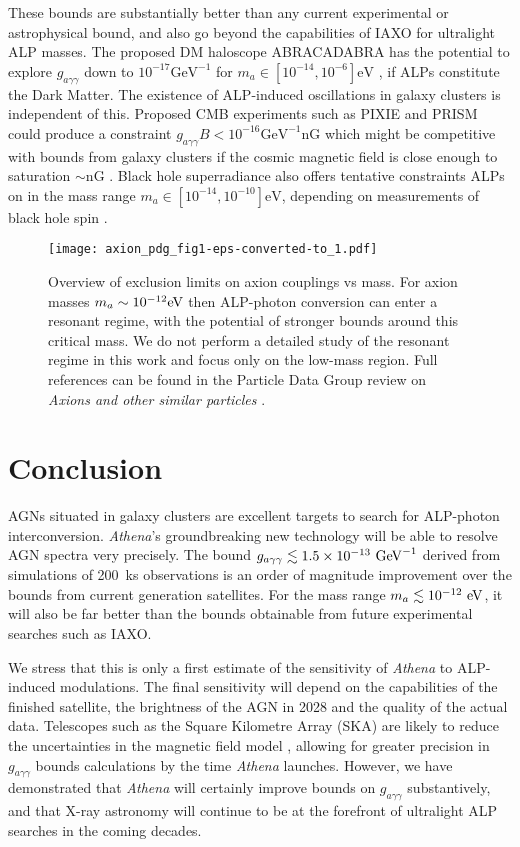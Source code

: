 \documentclass[fleqn,usenatbib,useAMS]{mnras}
\begin{document}
These bounds are substantially better than any current experimental or astrophysical bound, and also go beyond the capabilities of IAXO for ultralight ALP masses. The proposed DM haloscope ABRACADABRA has the potential to explore $g_{a \gamma \gamma}$ down to $10^{-17} \text{GeV}^{-1}$ for $m_a \in [10^{-14},10^{-6}] \text{eV}$  \cite{Kahn:2016aff}, if ALPs constitute the Dark Matter. The existence of ALP-induced oscillations in galaxy clusters is independent of this. Proposed CMB experiments such as PIXIE \cite{Kogut:2011xw} and PRISM \cite{Andre:2013afa} could produce a constraint $g_{a \gamma \gamma} B < 10^{-16} \text{GeV}^{-1} \text{nG}$ which might be competitive with bounds from galaxy clusters if the cosmic magnetic field is close enough to saturation $\sim \text{nG}$ \cite{Tashiro:2013yea}. Black hole superradiance also offers tentative constraints ALPs on in the mass range $m_a \in [10^{-14},10^{-10}] \text{eV}$, depending on measurements of black hole spin \cite{Arvanitaki:2016qwi}.

\begin{figure}
\texttt{[image: axion\_pdg\_fig1-eps-converted-to\_1.pdf]}
\caption{Overview of exclusion limits on axion couplings vs mass. For axion masses $m_a \sim 10^{-12} {\rm eV}$ then ALP-photon conversion
can enter a resonant regime, with the potential of stronger bounds around this critical mass. We do not perform a detailed study of the resonant
regime in this work and focus only on the low-mass region. Full references can be found in the Particle Data Group review on {\it Axions and other similar particles} \cite{Patrignani:2016xqp}.}\label{fig:ExclusionLimit}
\end{figure}

\section{Conclusion}
\label{conclusion}
AGNs situated in galaxy clusters are excellent targets to search for ALP-photon interconversion. {\it Athena}'s groundbreaking new technology will be able to resolve AGN spectra very precisely. The bound ${g_{a\gamma\gamma} \lesssim 1.5 \times 10^{-13}~ \rm{GeV}^{-1}}$ derived from simulations of 200~ks observations is an order of magnitude improvement over the bounds from current generation satellites. For the mass range ${m_a \lesssim 10^{-12}~\rm{eV}}$, it will also be far better than the bounds obtainable from future experimental searches such as IAXO.


We stress that this is only a first estimate of  the sensitivity of {\it Athena} to ALP-induced modulations. The final sensitivity will depend on the capabilities of the finished satellite, the brightness of the AGN in 2028 and the quality of the actual data.
Telescopes such as the Square Kilometre Array (SKA) are likely to reduce the uncertainties in the magnetic field model \cite{Braun:2015zta}, allowing for greater precision in $g_{a \gamma \gamma}$ bounds calculations by the time {\it Athena} launches. However, we have demonstrated that {\it Athena} will certainly improve bounds on $g_{a \gamma \gamma}$ substantively, and that X-ray astronomy will continue to be at the forefront of ultralight ALP searches in the coming decades.
\end{document}
